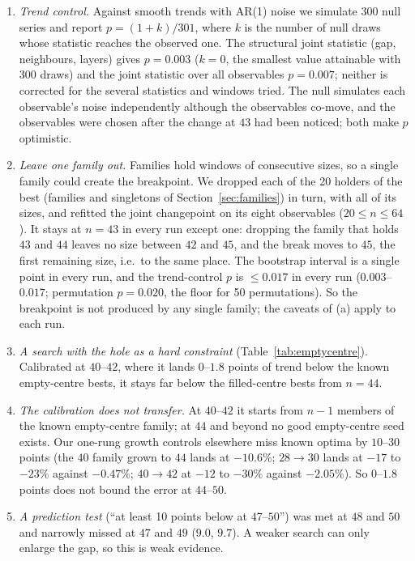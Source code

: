 \documentclass[11pt]{amsart}
\theoremstyle{definition}
\begin{document}
\begin{enumerate}[label=(\alph*)]
\item \emph{Trend control.} Against smooth trends with AR(1) noise we simulate 300 null series and report $p = (1+k)/301$, where $k$ is the number of null draws whose statistic reaches the observed one. The structural joint statistic (gap, neighbours, layers) gives $p = 0.003$ ($k = 0$, the smallest value attainable with 300 draws) and the joint statistic over all observables $p = 0.007$; neither is corrected for the several statistics and windows tried. The null simulates each observable's noise independently although the observables co-move, and the observables were chosen after the change at $43$ had been noticed; both make $p$ optimistic. %
\item \emph{Leave one family out.} Families hold windows of consecutive sizes, so a single family could create the breakpoint. We dropped each of the 20 holders of the best (families and singletons of Section~\ref{sec:families}) in turn, with all of its sizes, and refitted the joint changepoint on its eight observables ($20 \le n \le 64$). It stays at $n = 43$ in every run except one: dropping the family that holds $43$ and $44$ leaves no size between $42$ and $45$, and the break moves to $45$, the first remaining size, i.e.\ to the same place. The bootstrap interval is a single point in every run, and the trend-control $p$ is $\le 0.017$ in every run ($0.003$--$0.017$; permutation $p = 0.020$, the floor for 50 permutations). So the breakpoint is not produced by any single family; the caveats of (a) apply to each run. %
\item \emph{A search with the hole as a hard constraint} (Table~\ref{tab:emptycentre}). Calibrated at $40$--$42$, where it lands $0$--$1.8$ points of trend below the known empty-centre bests, it stays far below the filled-centre bests from $n = 44$. %
\item \emph{The calibration does not transfer.} At $40$--$42$ it starts from $n-1$ members of the known empty-centre family; at $44$ and beyond no good empty-centre seed exists. Our one-rung growth controls elsewhere miss known optima by $10$--$30$ points (the $40$ family grown to $44$ lands at $-10.6\%$; $28 \to 30$ lands at $-17$ to $-23\%$ against $-0.47\%$; $40 \to 42$ at $-12$ to $-30\%$ against $-2.05\%$). So $0$--$1.8$ points does not bound the error at $44$--$50$. %
\item \emph{A prediction test} (``at least 10 points below at $47$--$50$'') was met at $48$ and $50$ and narrowly missed at $47$ and $49$ ($9.0$, $9.7$). A weaker search can only enlarge the gap, so this is weak evidence. %
\end{enumerate}
\end{document}
